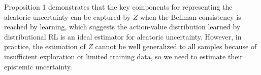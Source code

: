 \documentclass{article}
\newcommand{\horizon}{T_{H}}
\newcommand{\state}{s}
\newcommand{\action}{a}
\newcommand{\transition}{t}
\newcommand{\reward}{r}
\newcommand{\dataset}{\mathcal{D}}
\newcommand{\expect}{\mathbb{E}}
\newtheorem{proposition}{Proposition}
\DeclareMathOperator*{\argmax}{argmax}
\begin{document}
Proposition 1 demonstrates that the key components for representing the aleatoric uncertainty can be captured by $Z$ when the Bellman consistency is reached by learning, which suggests the action-value distribution learned by distributional RL is an ideal estimator for aleatoric uncertainty.  However, in practice,  the estimation of $Z$ cannot be well generalized to all samples because of insufficient exploration or limited training data, so we need to estimate their epistemic uncertainty. 



\end{document}
